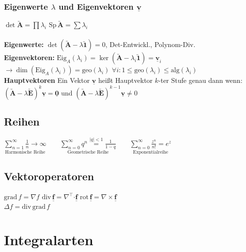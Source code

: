 \documentclass[6pt,a4paper]{scrartcl}
\newcommand{\ma}[1]{\ensuremath{\utilde{\boldsymbol {#1}}}}						%
\newcommand{\bdot}{\ensuremath{\boldsymbol \cdot}} 								%
\renewcommand{\vec}[1]{\ensuremath{\underline{\boldsymbol {#1}}}}
\renewcommand{\emph}[1]{\textbf{#1}}
\newcommand{\Ra}[0]{\ensuremath{\Rightarrow}}									%
\newcommand{\ra}[0]{\ensuremath{\rightarrow}} 									%
\newcommand{\diff}{\ensuremath{\ \mathrm d}}									%
\newcommand{\grad}{\ensuremath{\mathrm{grad}\,}}								%
\renewcommand{\div}{\ensuremath{\mathrm{div}\,}}								%
\newcommand{\rot}{\ensuremath{\mathrm{rot}\,}}									%
\newcommand{\Sp}{\ensuremath{\mathrm{Sp}\,}}									%
\begin{document}
\begin{multicols}{4}
	\subsubsection{Eigenwerte $\lambda$ und Eigenvektoren $\vec v$}
	\boxed{\ma A \vec v = \lambda \vec v} \qquad $\det \ma A = \prod \lambda_i$ \qquad $\Sp \ma A = \sum \lambda_i$\\\\
	\emph{Eigenwerte:} $\det(\ma A - \lambda \ma 1) = 0$, Det-Entwickl., Polynom-Div. \\
	\emph{Eigenvektoren:} $\mathrm{Eig}_A (\lambda_i) = \ker(\ma A - \lambda_i \ma 1) = \vec v_i$\\
	$\ra \dim(\mathrm{Eig}_A (\lambda_i)) = \mathrm{geo}(\lambda_i)$ \quad $\forall i : 1 \le \mathrm{geo}(\lambda_i) \le \mathrm{alg}(\lambda_i)$
	\emph{Hauptvektoren}
	Ein Vektor $\vec v$ heißt Hauptvektor $k$-ter Stufe genau dann wenn:
	$(\ma A - \lambda \ma E)^{k} \vec{v} = \vec{0}$ und $(\ma A - \lambda \ma E)^{k-1} \vec v \not = 0$


\subsection{Reihen}

$\underset{\text{Harmonische Reihe}}{\sum\limits_{n=1}^\infty \frac{1}{n} \ra \infty} \qquad   \underset{\text{Geometrische Reihe}}{\sum\limits_{n=0}^\infty q^n \stackrel{|q|<1}= \frac{1}{1-q}}  \qquad \underset{\text{Exponentialreihe}}{\sum\limits_{n = 0}^{\infty} \frac{z^n}{n!} = e^z}$

\subsection{Vektoroperatoren}
$\grad f = \nabla f$ \qquad $\div \vec f = \nabla^\top \bdot \vec f$ \qquad $\rot \vec f = \nabla \times \vec f$\\
$\Delta f = \div{\grad{f}}$



\section{Integralarten}
	

\end{multicols}
\end{document}
